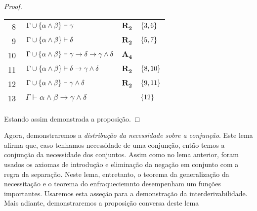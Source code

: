 \begin{tcolorbox}[enhanced jigsaw, breakable, sharp corners, colframe=black, colback=white, boxrule=0.5pt, left=1.5mm, right=1.5mm, top=1.5mm, bottom=1.5mm]
\begin{lemma}
\begin{proof}
\begin{xltabular}{\textwidth}{r | X l l}
            \scriptsize{\phantom{0}8}\phantom{ } & $\ \Gamma\cup\set{\alpha\wedge\beta}\vdash\gamma$                                & $\hyperref[modal.rule.2]{\mathbf{R_2}}$            & $\left\{3,6\right\}$\\[\rowskip]
            \scriptsize{\phantom{0}9}\phantom{ } & $\ \Gamma\cup\set{\alpha\wedge\beta}\vdash\delta$                                & $\hyperref[modal.rule.2]{\mathbf{R_2}}$            & $\left\{5,7\right\}$\\[\rowskip]
            \scriptsize{10}\phantom{ }           & $\ \Gamma\cup\set{\alpha\wedge\beta}\vdash\gamma\to\delta\to\gamma\wedge\delta$  & $\hyperref[modal.axiom.3]{\mathbf{A_4}}$           & \\[\rowskip]
            \scriptsize{11}\phantom{ }           & $\ \Gamma\cup\set{\alpha\wedge\beta}\vdash\delta\to\gamma\wedge\delta$           & $\hyperref[modal.rule.2]{\mathbf{R_2}}$            & $\left\{8,10\right\}$\\[\rowskip]
            \scriptsize{12}\phantom{ }           & $\ \Gamma\cup\set{\alpha\wedge\beta}\vdash\gamma\wedge\delta$                    & $\hyperref[modal.rule.2]{\mathbf{R_2}}$            & $\left\{9,11\right\}$\\[\rowskip]
            \scriptsize{13}\phantom{ }           & $\ \Gamma\vdash\alpha\wedge\beta\to\gamma\wedge\delta$                           &                                & $\left\{12\right\}$
        \end{xltabular}
        \normalsize

        \vspace{0.5\baselineskip}
        Estando assim demonstrada a proposição.
        \end{proof}
    \end{lemma}
\end{tcolorbox}

\vspace{.5\baselineskip}
Agora, demonstraremos a \emph{distribução da necessidade sobre a conjunção}.
Este lema afirma que, caso tenhamos necessidade de uma conjunção, então temos a conjunção da necessidade dos conjuntos.
Assim como no lema anterior, foram usados os axiomas de introdução e eliminação da negação em conjunto com a regra da separação.
Neste lema, entretanto, o teorema da generalização da necessitação e o teorema do enfraqueciemnto desempenham um funções importantes.
Usaremos esta asseção para a demonstração da interderivabilidade.
Mais adiante, demonstraremos a proposição conversa deste lema

